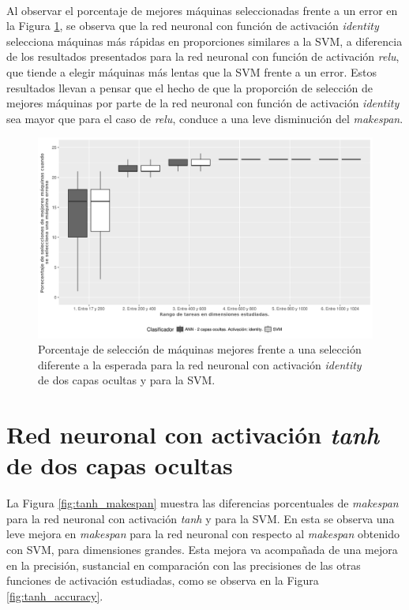 \paragraph{}Al observar el porcentaje de mejores máquinas seleccionadas frente a un error en la Figura \ref{fig:identity_mejores}, se observa que la red neuronal con función de activación \textit{identity} selecciona máquinas más rápidas en proporciones similares a la SVM, a diferencia de los resultados presentados para la red neuronal con función de activación \textit{relu}, que tiende a elegir máquinas más lentas que la SVM frente a un error.
Estos resultados llevan a pensar que el hecho de que la proporción de selección de mejores máquinas por parte de la red neuronal con función de activación \textit{identity} sea mayor que para el caso de \textit{relu}, conduce a una leve disminución del \textit{makespan}. 

\begin{figure}[H]
  \centering
  \includegraphics[width=\columnwidth]{imagenes/identity/4_porcentaje_maquinas_mejores_ann_2_capas_ocultas_identity.png}
  \caption{Porcentaje de selección de máquinas mejores frente a una selección diferente a la esperada para la red neuronal con activación \textit{identity} de dos capas ocultas y para la SVM.}
  \label{fig:identity_mejores}
\end{figure}

\section{Red neuronal con activación \textit{tanh} de dos capas ocultas}

La Figura \ref{fig:tanh_makespan} muestra las diferencias porcentuales de \textit{makespan} para la red neuronal con activación \textit{tanh} y para la SVM.
En esta se observa una leve mejora en \textit{makespan} para la red neuronal con respecto al \textit{makespan} obtenido con SVM, para dimensiones grandes.
Esta mejora va acompañada de una mejora en la precisión, sustancial en comparación con las precisiones de las otras funciones de activación estudiadas, como se observa en la Figura \ref{fig:tanh_accuracy}.
 

